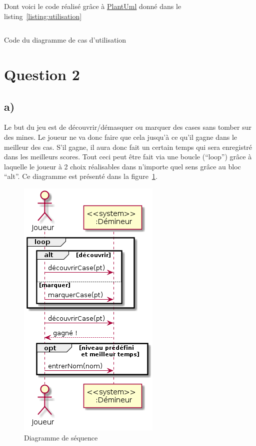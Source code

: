 \documentclass[a4paper,12pt]{article}
\begin{document}
Dont voici le code réalisé grâce à \href{https://plantuml.com/}{PlantUml} donné dans le listing~\ref{listing:utilisation}

\begin{listing}[ht]
    \inputminted[bgcolor=lightgray!40,linenos=true]{fsharp}{./code-images/q1}
    \caption{Code du diagramme de cas d'utilisation}
    \label{listing:utilisation}
\end{listing}

\clearpage

\section{Question 2}\label{question-2}

\subsection{a)}\label{a}

Le but du jeu est de découvrir/démasquer ou marquer des cases sans tomber sur des mines. Le joueur ne va donc faire que cela jusqu'à ce qu'il gagne dans le meilleur des cas. S'il gagne, il aura donc fait un certain temps qui sera enregistré dans les meilleurs scores. Tout ceci peut être fait via une boucle (``loop'') grâce à laquelle le joueur à 2 choix réalisables dans n'importe quel sens grâce au bloc ``alt''.
Ce diagramme est présenté dans la figure~\ref{fig:seqa}.

\begin{figure}[htbp]
    \centering
    \includegraphics[width=.5\textwidth]{./images/q2-a.png}
    \caption{Diagramme de séquence}
    \label{fig:seqa}
\end{figure}
\end{document}

